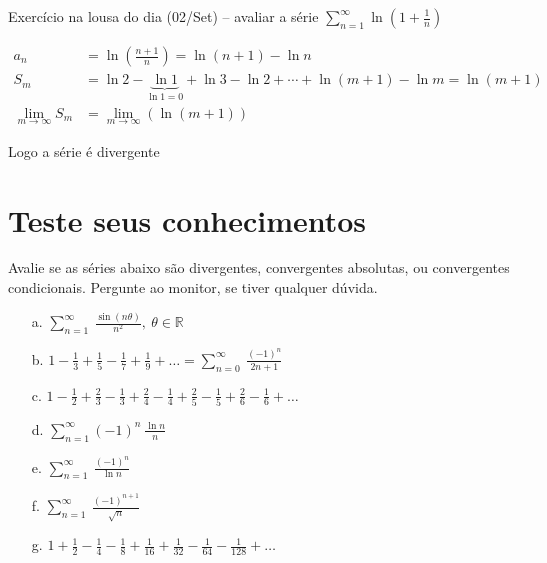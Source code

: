 \documentclass[12pt,openany, letterpaper]{book}
\newcommand{\LI}[1][n]{\lim_{{#1} \rightarrow \infty}}
\newcommand{\soma}[2][n]{\sum_{{#1} = #2}^\infty}
\begin{document}
Exercício na lousa do dia (02/Set) -- avaliar a série $\soma{1} \ln \left( 1 + \frac{1}{n}\right)$

\begin{align*}
a_n &= \ln \left( \frac{n+1}{n} \right) = \ln (n+1) - \ln n \\
S_m &= \ln 2 - \underbrace{\ln 1}_{\ln 1 = 0} + \ln 3 - \ln 2 + \cdots + \ln (m+1) - \ln m = \ln (m+1)\\
\LI[m] S_m &= \LI[m] (\ln (m+1))
\end{align*}

Logo a série é divergente

\section{Teste seus conhecimentos}{Avalie se as séries abaixo são divergentes, convergentes absolutas, ou convergentes condicionais. Pergunte ao monitor, se tiver qualquer dúvida.}
\begin{itemize}
\item [a.] $\displaystyle{\sum_{n=1}^{\infty} \ \frac{\sin(n\theta)}{n^2}, \ \theta \in \mathds{R}}$
\item [b.] $\displaystyle{1-\frac{1}{3}+\frac{1}{5}-\frac{1}{7}+ \frac{1}{9} + \hdots = \sum_{n=0}^{\infty} \ \frac{(-1)^n}{2n+1}}$
\item [c.] $\displaystyle{1-\frac{1}{2}+\frac{2}{3}-\frac{1}{3}+\frac{2}{4}-\frac{1}{4}+\frac{2}{5}-\frac{1}{5}+\frac{2}{6}}-\frac{1}{6}+ \hdots$
\item [d.] $\displaystyle{\sum_{n=1}^{\infty} (-1)^n \ \frac{\ln n}{n}}$
\item [e.] $\displaystyle{\sum_{n=1}^{\infty} \ \frac{(-1)^n}{\ln n}}$
\item [f.] $\displaystyle{\sum_{n=1}^{\infty} \ \frac{(-1)^{n+1}}{\sqrt{n}}}$
\item [g.] $\displaystyle{1+\frac{1}{2}-\frac{1}{4}-\frac{1}{8}+\frac{1}{16}+\frac{1}{32}-\frac{1}{64}-\frac{1}{128}+\hdots}$
\end{itemize}
\end{document}
